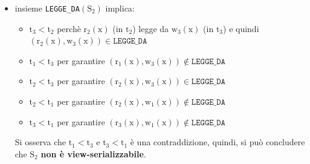 {\begin{itemize}[label=$\circ$, itemsep=\medskipamount]
    \item insieme \texttt{LEGGE\_DA}\( \mathrm{(S_2)} \) implica:
      \begin{itemize}[itemsep=\smallskipamount]
        \item \( \mathrm{t_3 < t_2} \) perchè \( \mathrm{r_2(x)} \) (in \( \mathrm{t_2} \)) legge da \( \mathrm{w_3(x)} \) (in \( \mathrm{t_3} \)) e quindi \( \mathrm{(r_2(x), w_3(x))} \in \texttt{LEGGE\_DA} \) 

        \item \( \mathrm{t_1 < t_3} \) per garantire \( \mathrm{(r_1(x), w_3(x))} \notin \texttt{LEGGE\_DA} \)
        \item \( \mathrm{t_2 < t_3} \) per garantire \( \mathrm{(r_2(x), w_3(x))} \in \texttt{LEGGE\_DA} \)
        \item \( \mathrm{t_2 < t_1} \) per garantire \( \mathrm{(r_2(x), w_1(x))} \notin \texttt{LEGGE\_DA} \)
        \item \( \mathrm{t_3 < t_1} \) per garantire \( \mathrm{(r_3(x), w_1(x))} \notin \texttt{LEGGE\_DA} \)
      \end{itemize}

      \smallskip
      Si osserva che \( \mathrm{t_1 < t_3} \) e \( \mathrm{t_3 < t_1} \) è una contraddizione, quindi, si può concludere che \( \mathrm{S_2} \) \textbf{non è view-serializzabile}.
  \end{itemize}
}

